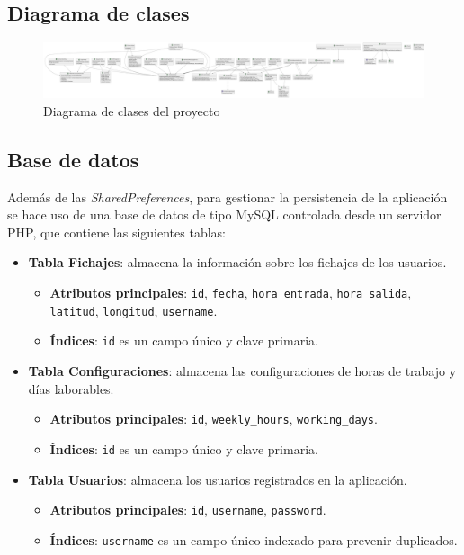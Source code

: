 \subsection{Diagrama de clases}

\begin{figure}[H]
    \centering
    \includegraphics[width=1\linewidth]{root/diagrama.png}
    \caption{Diagrama de clases del proyecto}
    \label{fig:diagrama}
\end{figure}

\subsection{Base de datos}

Además de las \textit{SharedPreferences}, para gestionar la persistencia de la aplicación se hace uso de una base de datos de tipo MySQL controlada desde un servidor PHP, que contiene las siguientes tablas:

\begin{itemize}
  \item \textbf{Tabla Fichajes}: almacena la información sobre los fichajes de los usuarios.
  \begin{itemize}
    \item \textbf{Atributos principales}: \texttt{id}, \texttt{fecha}, \texttt{hora\_entrada}, \texttt{hora\_salida}, \texttt{latitud}, \texttt{longitud}, \texttt{username}.
    \item \textbf{Índices}: \texttt{id} es un campo único y clave primaria.
  \end{itemize}
  \item \textbf{Tabla Configuraciones}: almacena las configuraciones de horas de trabajo y días laborables.
  \begin{itemize}
    \item \textbf{Atributos principales}: \texttt{id}, \texttt{weekly\_hours}, \texttt{working\_days}.
    \item \textbf{Índices}: \texttt{id} es un campo único y clave primaria.
  \end{itemize}
  \item \textbf{Tabla Usuarios}: almacena los usuarios registrados en la aplicación.
  \begin{itemize}
    \item \textbf{Atributos principales}: \texttt{id}, \texttt{username}, \texttt{password}.
    \item \textbf{Índices}: \texttt{username} es un campo único indexado para prevenir duplicados.
  \end{itemize}
\end{itemize}
